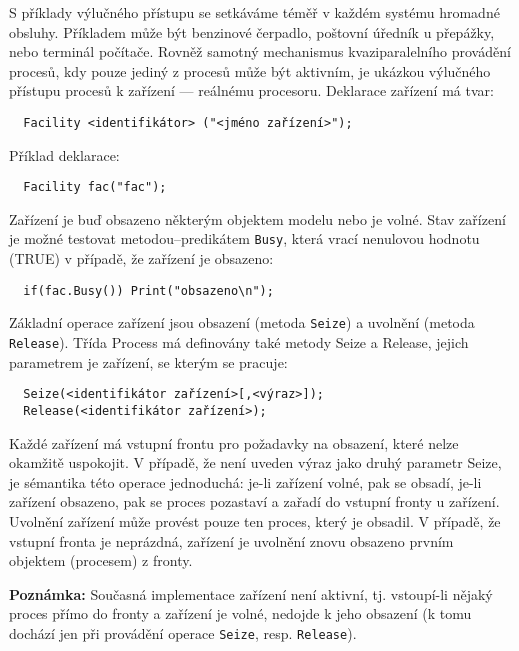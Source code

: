 \documentclass[a4paper]{article}
\begin{document}
S příklady výlučného přístupu se setkáváme téměř v každém systému hromadné
obsluhy. Příkladem může být benzinové čerpadlo, poštovní úředník u přepážky,
nebo terminál počítače. Rovněž samotný mechanismus kvaziparalelního provádění
procesů, kdy pouze jediný z procesů může být aktivním, je ukázkou výlučného
přístupu procesů k zařízení --- reálnému procesoru. Deklarace zařízení má tvar:

\begin{verbatim}
  Facility <identifikátor> ("<jméno zařízení>");
\end{verbatim}

Příklad deklarace:

\begin{verbatim}
  Facility fac("fac");
\end{verbatim}

Zařízení je buď obsazeno některým objektem modelu nebo je volné.
Stav zařízení je možné testovat metodou--predikátem \verb|Busy|, která vrací
nenulovou hodnotu (TRUE) v případě, že zařízení je obsazeno:

\begin{verbatim}
  if(fac.Busy()) Print("obsazeno\n");
\end{verbatim}

Základní operace zařízení jsou obsazení (metoda \verb|Seize|)
a uvolnění (metoda \verb|Release|). Třída Process má definovány také
metody Seize a Release, jejich parametrem je zařízení, se
kterým se pracuje:

\begin{verbatim}
  Seize(<identifikátor zařízení>[,<výraz>]);
  Release(<identifikátor zařízení>);
\end{verbatim}


Každé zařízení má vstupní frontu pro požadavky na obsazení,
které nelze okamžitě uspokojit. V případě, že není uveden výraz
jako druhý parametr Seize, je sémantika této operace
jednoduchá: je-li zařízení volné, pak se obsadí, je-li zařízení
obsazeno, pak se proces pozastaví a zařadí do vstupní fronty
u zařízení. Uvolnění zařízení může provést pouze ten proces,
který je obsadil. V případě, že vstupní fronta je neprázdná, 
zařízení je uvolnění znovu obsazeno prvním objektem (procesem)
z fronty.

\bigskip 
\noindent 
{\bf Poznámka:} Současná implementace zařízení není
aktivní, tj. vstoupí-li nějaký proces přímo do fronty a zařízení je volné,
nedojde k jeho obsazení (k tomu dochází jen při provádění operace \verb|Seize|,
resp. \verb|Release|).
\end{document}
